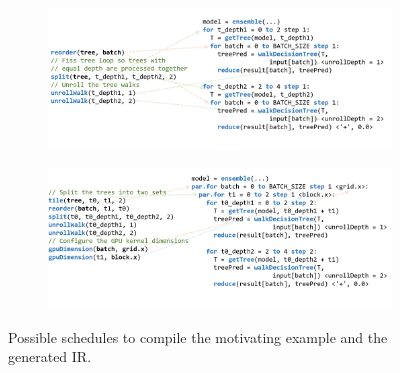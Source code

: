 \begin{figure}[]
  \begin{subfigure}[t]{.495\linewidth}
    \vspace{0pt}
    \centering
    \includegraphics[width=\linewidth]{figures/MotivatingExample1.PNG}
    \caption{\label{fig:schedulea}}
  \end{subfigure}\hfill
  \begin{subfigure}[t]{.495\linewidth}
    \vspace{0pt}
    \centering
    \includegraphics[width=\linewidth]{figures/MotivatingExample2.PNG}
    \caption{\label{fig:scheduleb}}
  \end{subfigure}
  \caption{Possible schedules to compile the motivating example and the generated \Treebeard{} IR.}
  \label{Fig:Schedules}
\end{figure}

